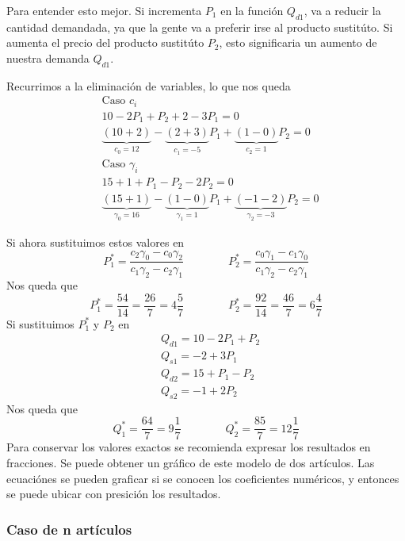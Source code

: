 Para entender esto mejor. Si incrementa \(P_1\) en la función \(Q_{d1}\), va a reducir la cantidad demandada, ya que la gente va a preferir irse al producto sustitúto. Si aumenta el precio del producto sustitúto \(P_2\), esto significaria un aumento de nuestra demanda \(Q_{d1}\).

Recurrimos a la eliminación de variables, lo que nos queda
\begin{equation}
    \begin{aligned}
        &\text{Caso } c_i \\
        & 10-2P_1+P_2+2-3P_1 = 0 \\ 
        & \underbrace{(10+2)}_{c_0 = 12}-\underbrace{(2+3)}_{c_1=-5}P_1+\underbrace{(1-0)}_{c_2=1}P_2=0 \\
        &\text{Caso }\gamma_i \\
        & 15+1+P_1-P_2-2P_2=0 \\
        & \underbrace{(15+1)}_{\gamma_0 = 16}-\underbrace{(1-0)}_{\gamma_1=1}P_1+\underbrace{(-1-2)}_{\gamma_2=-3}P_2=0 
    \end{aligned}
\end{equation}

Si ahora sustituimos estos valores en 
\[
P_1^\ast=\frac{c_2\gamma_0-c_0\gamma_2}{c_1\gamma_2-c_2\gamma_1} \qquad \qquad P_2^\ast=\frac{c_0\gamma_1-c_1\gamma_0}{c_1\gamma_2-c_2\gamma_1}
\]
Nos queda que 
\[
P_1^\ast=\frac{54}{14}=\frac{26}{7}=4\frac{5}{7} \qquad \qquad P_2^\ast=\frac{92}{14}=\frac{46}{7}=6\frac{4}{7}
\]
Si sustituimos \(P_1^\ast\) y \(P_2\) en 
\begin{equation}
    \begin{aligned}
        & Q_{d1}=10-2P_1+P_2 \\ 
        & Q_{s1}=-2+3P_1 \\
        & Q_{d2}=15+P_1-P_2 \\
        & Q_{s2}=-1+2P_2
    \end{aligned}
\end{equation}
Nos queda que 
\[
Q_1^\ast=\frac{64}{7}=9\frac{1}{7} \qquad \qquad Q_2^\ast=\frac{85}{7}=12\frac{1}{7}
\]
Para conservar los valores exactos se recomienda expresar los resultados en fracciones. Se puede obtener un gráfico de este modelo de dos artículos. Las ecuaciónes se pueden graficar si se conocen los coeficientes numéricos, y entonces se puede ubicar con presición los resultados.


\subsubsection{Caso de n artículos}

